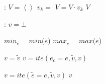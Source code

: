 \documentclass{article}
\begin{document}
\begin{algorithm}
  \begin{algorithmic}[1]
	:
		\State $V = \left\langle \right\rangle$ 
			\State $v_k = $ 
			\State $V = V \cdot v_k$
		\EndFor
		\State \Return $V$
	\EndFunction
  \end{algorithmic}

  \bigskip

  \begin{algorithmic}[1]
	:
		\State $v = \bot$ 

		\State $min_e = min(e$)
		\State $max_e = max(e$)

				\State ${v} = \widetilde{v}$
			\EndIf
		\Else
					\State $v = ite(e_c = e, \widetilde{v}, v)$
				\EndIf
			\EndFor
		\EndIf

				\State $v = ite(\widetilde{e} = e, \widetilde{v}, v)$
			\EndIf
		\EndFor
		\State \Return $v$
	\EndFunction
  \end{algorithmic}
  
\end{algorithm}
\end{document}

